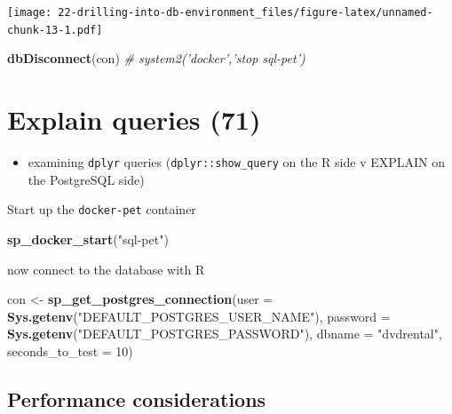\documentclass[]{book}
\newenvironment{Shaded}{\begin{snugshade}}{\end{snugshade}}
\newcommand{\CommentTok}[1]{\textcolor[rgb]{0.56,0.35,0.01}{\textit{#1}}}
\newcommand{\DataTypeTok}[1]{\textcolor[rgb]{0.13,0.29,0.53}{#1}}
\newcommand{\DecValTok}[1]{\textcolor[rgb]{0.00,0.00,0.81}{#1}}
\newcommand{\KeywordTok}[1]{\textcolor[rgb]{0.13,0.29,0.53}{\textbf{#1}}}
\newcommand{\NormalTok}[1]{#1}
\newcommand{\StringTok}[1]{\textcolor[rgb]{0.31,0.60,0.02}{#1}}
\providecommand{\tightlist}{%
  \setlength{\itemsep}{0pt}\setlength{\parskip}{0pt}}
\theoremstyle{definition}
\theoremstyle{definition}
\theoremstyle{definition}
\theoremstyle{remark}
\begin{document}
\texttt{[image: 22-drilling-into-db-environment\_files/figure-latex/unnamed-chunk-13-1.pdf]}

\begin{Shaded}
\begin{Highlighting}[]
\KeywordTok{dbDisconnect}\NormalTok{(con)}
\CommentTok{# system2('docker','stop sql-pet')}
\end{Highlighting}
\end{Shaded}

\hypertarget{explain-queries-71}{%
\chapter{Explain queries (71)}\label{explain-queries-71}}

\begin{itemize}
\tightlist
\item
  examining \texttt{dplyr} queries (\texttt{dplyr::show\_query} on the R
  side v EXPLAIN on the PostgreSQL side)
\end{itemize}

Start up the \texttt{docker-pet} container

\begin{Shaded}
\begin{Highlighting}[]
\KeywordTok{sp_docker_start}\NormalTok{(}\StringTok{"sql-pet"}\NormalTok{)}
\end{Highlighting}
\end{Shaded}

now connect to the database with R

\begin{Shaded}
\begin{Highlighting}[]
\NormalTok{con <-}\StringTok{ }\KeywordTok{sp_get_postgres_connection}\NormalTok{(}\DataTypeTok{user =} \KeywordTok{Sys.getenv}\NormalTok{(}\StringTok{"DEFAULT_POSTGRES_USER_NAME"}\NormalTok{),}
                         \DataTypeTok{password =} \KeywordTok{Sys.getenv}\NormalTok{(}\StringTok{"DEFAULT_POSTGRES_PASSWORD"}\NormalTok{),}
                         \DataTypeTok{dbname =} \StringTok{"dvdrental"}\NormalTok{,}
                         \DataTypeTok{seconds_to_test =} \DecValTok{10}\NormalTok{)}
\end{Highlighting}
\end{Shaded}

\hypertarget{performance-considerations}{%
\section{Performance considerations}\label{performance-considerations}}
\end{document}
